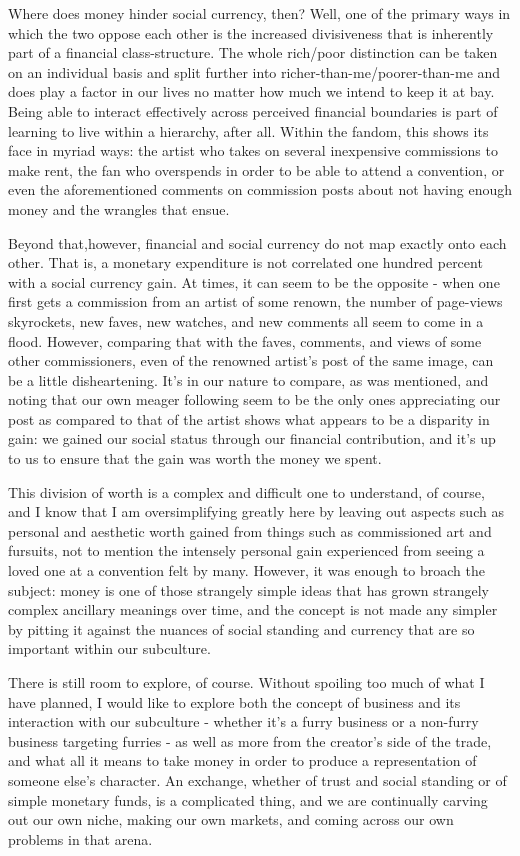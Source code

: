 Where does money hinder social currency, then? Well, one of the primary ways in which the two oppose each other is the increased divisiveness that is inherently part of a financial class-structure. The whole rich/poor distinction can be taken on an individual basis and split further into richer-than-me/poorer-than-me and does play a factor in our lives no matter how much we intend to keep it at bay. Being able to interact effectively across perceived financial boundaries is part of learning to live within a hierarchy, after all. Within the fandom, this shows its face in myriad ways: the artist who takes on several inexpensive commissions to make rent, the fan who overspends in order to be able to attend a convention, or even the aforementioned comments on commission posts about not having enough money and the wrangles that ensue.

Beyond that,however, financial and social currency do not map exactly onto each other. That is, a monetary expenditure is not correlated one hundred percent with a social currency gain. At times, it can seem to be the opposite - when one first gets a commission from an artist of some renown, the number of page-views skyrockets, new faves, new watches, and new comments all seem to come in a flood. However, comparing that with the faves, comments, and views of some other commissioners, even of the renowned artist's post of the same image, can be a little disheartening. It's in our nature to compare, as was mentioned, and noting that our own meager following seem to be the only ones appreciating our post as compared to that of the artist shows what appears to be a disparity in gain: we gained our social status through our financial contribution, and it's up to us to ensure that the gain was worth the money we spent.

This division of worth is a complex and difficult one to understand, of course, and I know that I am oversimplifying greatly here by leaving out aspects such as personal and aesthetic worth gained from things such as commissioned art and fursuits, not to mention the intensely personal gain experienced from seeing a loved one at a convention felt by many. However, it was enough to broach the subject: money is one of those strangely simple ideas that has grown strangely complex ancillary meanings over time, and the concept is not made any simpler by pitting it against the nuances of social standing and currency that are so important within our subculture.

There is still room to explore, of course. Without spoiling too much of what I have planned, I would like to explore both the concept of business and its interaction with our subculture - whether it's a furry business or a non-furry business targeting furries - as well as more from the creator's side of the trade, and what all it means to take money in order to produce a representation of someone else's character. An exchange, whether of trust and social standing or of simple monetary funds, is a complicated thing, and we are continually carving out our own niche, making our own markets, and coming across our own problems in that arena.
